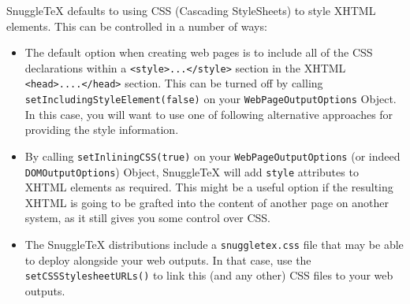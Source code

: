
SnuggleTeX defaults to using CSS (Cascading StyleSheets) to style XHTML elements.
This can be controlled in a number of ways:

\begin{itemize}

\item
  The default option when creating web pages is to include all of the CSS
  declarations within a \verb|<style>...</style>| section in the XHTML
  \verb|<head>....</head>| section. This can be turned off by calling
  \verb|setIncludingStyleElement(false)| on your \verb|WebPageOutputOptions|
  Object. In this case, you will want to use one of following alternative
  approaches for providing the style information.

\item
  By calling \verb|setInliningCSS(true)| on your \verb|WebPageOutputOptions|
  (or indeed \verb|DOMOutputOptions|)
  Object, SnuggleTeX will add \verb|style| attributes to XHTML elements as
  required. This might be a useful option if the resulting XHTML is going to
  be grafted into the content of another page on another system, as it still
  gives you some control over CSS.

\item
  The SnuggleTeX distributions include a \verb|snuggletex.css| file that may
  be able to deploy alongside your web outputs. In that case, use the
  \verb|setCSSStylesheetURLs()| to link this (and any other) CSS files to
  your web outputs.

\end{itemize}
